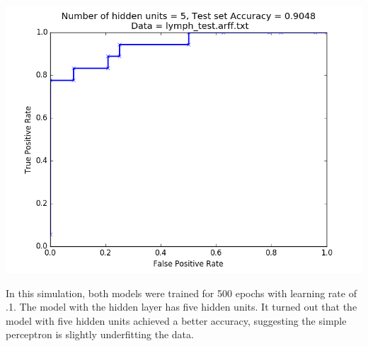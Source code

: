\documentclass[paper=a4, fontsize=11pt]{scrartcl} %
\numberwithin{equation}{section} %
\numberwithin{figure}{section} %
\numberwithin{table}{section} %
\begin{document}
\begin{center}
\includegraphics[scale=.5]{pics/roc_hidden.png}
\end{center}

In this simulation, both models were trained for 500 epochs with learning rate of .1. The model with the hidden layer has five hidden units. It turned out that the model with five hidden units achieved a better accuracy, suggesting the simple perceptron is slightly underfitting the data. 
\end{document}
